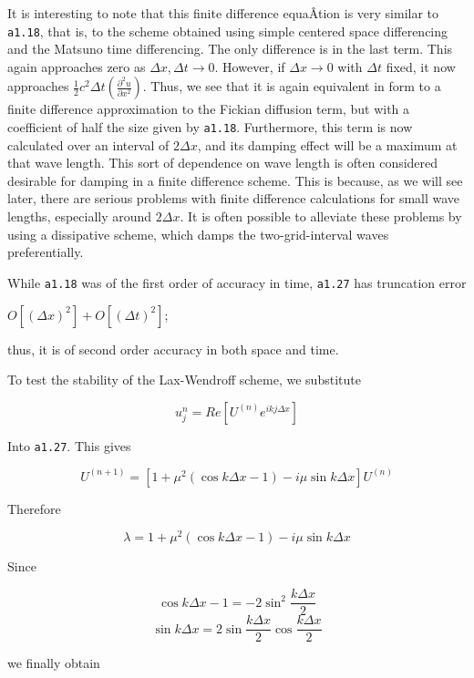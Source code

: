 It is interesting to note that this finite difference equaÂ­tion is very
similar to \texttt{a1.18}, that is, to the scheme obtained using simple
centered space differencing and the Matsuno time differencing. The only
difference is in the last term. This again approaches zero as
\(\Delta x,\Delta t \rightarrow 0\). However, if
\(\Delta x \rightarrow 0\) with \(\Delta t\) fixed, it now approaches
\(\frac{1}{2}c^{2}\Delta t\left( \frac{\partial^{2}u}{\partial x^{2}} \right)\).
Thus, we see that it is again equivalent in form to a finite difference
approximation to the Fickian diffusion term, but with a coefficient of
half the size given by \texttt{a1.18}. Furthermore, this term is now
calculated over an interval of \(2\Delta x\), and its damping effect
will be a maximum at that wave length. This sort of dependence on wave
length is often considered desirable for damping in a finite difference
scheme. This is because, as we will see later, there are serious
problems with finite difference calculations for small wave lengths,
especially around \(2\Delta x\). It is often possible to alleviate these
problems by using a dissipative scheme, which damps the
two-grid-interval waves preferentially.

While \texttt{a1.18} was of the first order of accuracy in time,
\texttt{a1.27} has truncation error

\(O\left\lbrack \left( \Delta x \right)^{2} \right\rbrack + O\left\lbrack \left( \Delta t \right)^{2} \right\rbrack\);

thus, it is of second order accuracy in both space and time.

To test the stability of the Lax-Wendroff scheme, we substitute

 {\[u_{j}^{n} = Re\left\lbrack U^{\left( n \right)}e^{i  k  j \Delta x} \right\rbrack\]}

Into \texttt{a1.27}. This gives

 {\[U^{\left( n + 1 \right)} = \left\lbrack 1 + \mu^{2}\left( \cos{k\Delta x - 1} \right) -
i\mu\sin{k\Delta x} \right\rbrack U^{\left( n \right)}\]}

Therefore

 {\[\lambda = 1 + \mu^{2}\left( \cos{k\Delta x - 1} \right) - i\mu\sin{k\Delta x}\]}

Since

\[\cos{k\Delta x - 1} = - 2\sin^{2}\frac{k\Delta x}{2}\]\[\sin{k\Delta x} = 2\sin\frac{k\Delta x}{2}\cos\frac{k\Delta x}{2}\]

we finally obtain

